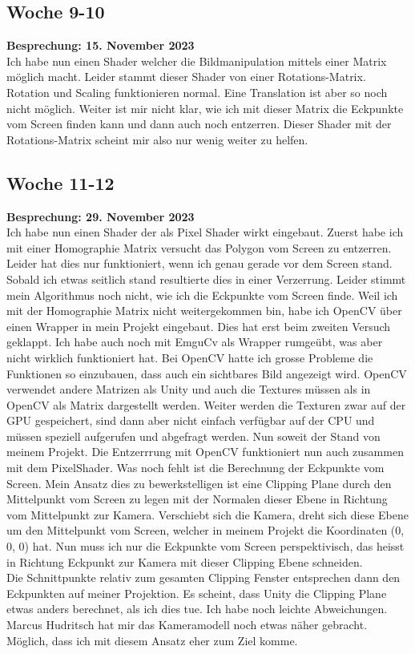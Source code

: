 \subsection{Woche 9-10}
\textbf{Besprechung: 15. November 2023} \\
Ich habe nun einen Shader welcher die Bildmanipulation mittels einer Matrix möglich macht. Leider stammt dieser Shader von einer Rotations-Matrix. Rotation und Scaling funktionieren normal. Eine Translation ist aber so noch nicht möglich. Weiter ist mir nicht klar, wie ich mit dieser Matrix die Eckpunkte vom Screen finden kann und dann auch noch entzerren. Dieser Shader mit der Rotations-Matrix scheint mir also nur wenig weiter zu helfen.

\subsection{Woche 11-12}
\textbf{Besprechung: 29. November 2023} \\
Ich habe nun einen Shader der als Pixel Shader wirkt eingebaut. Zuerst habe ich mit einer Homographie Matrix versucht das Polygon vom Screen zu entzerren. Leider hat dies nur funktioniert, wenn ich genau gerade vor dem Screen stand. Sobald ich etwas seitlich stand resultierte dies in einer Verzerrung. Leider stimmt mein Algorithmus noch nicht, wie ich die Eckpunkte vom Screen finde. Weil ich mit der Homographie Matrix nicht weitergekommen bin, habe ich OpenCV über einen Wrapper in mein Projekt eingebaut. Dies hat erst beim zweiten Versuch geklappt. Ich habe auch noch mit EmguCv als Wrapper rumgeübt, was aber nicht wirklich funktioniert hat.
Bei OpenCV hatte ich grosse Probleme die Funktionen so einzubauen, dass auch ein sichtbares Bild angezeigt wird. OpenCV verwendet andere Matrizen als Unity und auch die Textures müssen als in OpenCV als Matrix dargestellt werden. Weiter werden die Texturen zwar auf der GPU gespeichert, sind dann aber nicht einfach verfügbar auf der CPU und müssen speziell aufgerufen und abgefragt werden. Nun soweit der Stand von meinem Projekt. Die Entzerrrung mit OpenCV funktioniert nun auch zusammen mit dem PixelShader. 
Was noch fehlt ist die Berechnung der Eckpunkte vom Screen. Mein Ansatz dies zu bewerkstelligen ist eine Clipping Plane durch den Mittelpunkt vom Screen zu legen mit der Normalen dieser Ebene in Richtung vom Mittelpunkt zur Kamera. Verschiebt sich die Kamera, dreht sich diese Ebene um den Mittelpunkt vom Screen, welcher in meinem Projekt die Koordinaten (0, 0, 0) hat. Nun muss ich nur die Eckpunkte vom Screen perspektivisch, das heisst in Richtung Eckpunkt zur Kamera mit dieser Clipping Ebene schneiden. \\ Die Schnittpunkte relativ zum gesamten Clipping Fenster entsprechen dann den Eckpunkten auf meiner Projektion. 
Es scheint, dass Unity die Clipping Plane etwas anders berechnet, als ich dies tue. Ich habe noch leichte Abweichungen.
Marcus Hudritsch hat mir das Kameramodell noch etwas näher gebracht. Möglich, dass ich mit diesem Ansatz eher zum Ziel komme.

